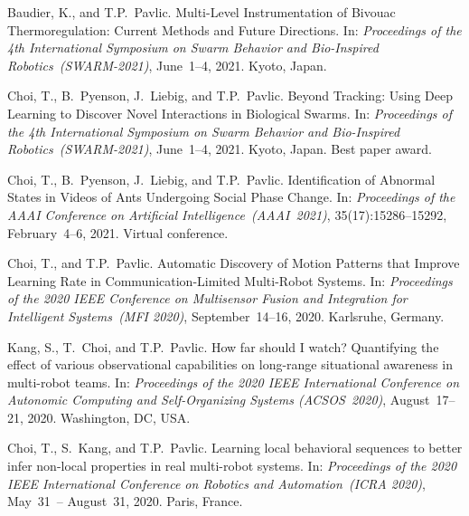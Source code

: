 \documentclass[10pt]{article}           %
\begin{document}
\begin{bibenum}
    \item Baudier, K., and T.P.~Pavlic.
        Multi-Level Instrumentation of Bivouac Thermoregulation: Current
        Methods and Future Directions.
        In: \emph{Proceedings of the 4th International Symposium on
            Swarm Behavior and Bio-Inspired Robotics~(SWARM-2021)},
            June~1--4, 2021. Kyoto, Japan.

    \item Choi, T., B.~Pyenson, J.~Liebig, and T.P.~Pavlic.
        Beyond Tracking: Using Deep Learning to Discover Novel
        Interactions in Biological Swarms.
        In: \emph{Proceedings of the 4th International Symposium on
            Swarm Behavior and Bio-Inspired Robotics~(SWARM-2021)},
            June~1--4, 2021. Kyoto, Japan. Best paper award.

    \item Choi, T., B.~Pyenson, J.~Liebig, and T.P.~Pavlic.
        Identification of Abnormal States in Videos of Ants Undergoing
        Social Phase Change.
        In: \emph{Proceedings of the AAAI Conference on Artificial
            Intelligence~(AAAI~2021)}, 35(17):15286--15292,
            February~4--6, 2021. Virtual conference.

    \item Choi, T., and T.P.~Pavlic.
        Automatic Discovery of Motion Patterns that Improve Learning
        Rate in Communication-Limited Multi-Robot Systems.
        In: \emph{Proceedings of the 2020 IEEE Conference on Multisensor
        Fusion and Integration for Intelligent Systems~(MFI 2020)},
        September~14--16, 2020. Karlsruhe, Germany.

    \item Kang, S., T.~Choi, and T.P.~Pavlic.
        How far should I watch? Quantifying the effect of various
        observational capabilities on long-range situational awareness
        in multi-robot teams.
        In: \emph{Proceedings of the 2020 IEEE International Conference
        on Autonomic Computing and Self-Organizing Systems
        (ACSOS~2020)}, August~17--21, 2020. Washington, DC, USA.

    \item Choi, T., S.~Kang, and T.P.~Pavlic.
        Learning local behavioral sequences to better infer non-local
        properties in real multi-robot systems.
        In: \emph{Proceedings of the 2020 IEEE International Conference
        on Robotics and Automation~(ICRA 2020)}, May~31~-- August~31,
        2020. Paris, France.


\end{bibenum}
\end{document}
